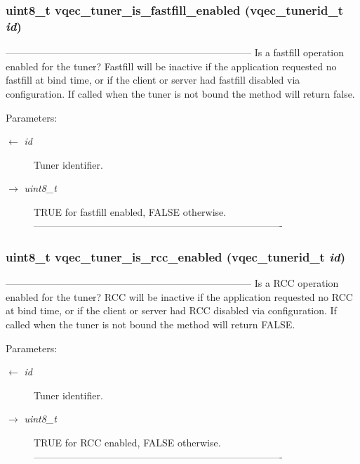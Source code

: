 \subsubsection{\setlength{\rightskip}{0pt plus 5cm}uint8\_\-t vqec\_\-tuner\_\-is\_\-fastfill\_\-enabled (vqec\_\-tunerid\_\-t {\em id})}\label{vqec__tuner_8c_ea34bc8b1f251e13dd145336b94a5d28}


--------------------------------------------------------------------------- Is a fastfill operation enabled for the tuner? Fastfill will be inactive if the application requested no fastfill at bind time, or if the client or server had fastfill disabled via configuration. If called when the tuner is not bound the method will return false.

\begin{Desc}
\item[Parameters:]
\begin{description}
\item[\mbox{$\leftarrow$} {\em id}]Tuner identifier. \item[\mbox{$\rightarrow$} {\em uint8\_\-t}]TRUE for fastfill enabled, FALSE otherwise. ---------------------------------------------------------------------------- \end{description}
\end{Desc}
\subsubsection{\setlength{\rightskip}{0pt plus 5cm}uint8\_\-t vqec\_\-tuner\_\-is\_\-rcc\_\-enabled (vqec\_\-tunerid\_\-t {\em id})}\label{vqec__tuner_8c_5fb2cc65331f006b110100d86b278821}


--------------------------------------------------------------------------- Is a RCC operation enabled for the tuner? RCC will be inactive if the application requested no RCC at bind time, or if the client or server had RCC disabled via configuration. If called when the tuner is not bound the method will return FALSE.

\begin{Desc}
\item[Parameters:]
\begin{description}
\item[\mbox{$\leftarrow$} {\em id}]Tuner identifier. \item[\mbox{$\rightarrow$} {\em uint8\_\-t}]TRUE for RCC enabled, FALSE otherwise. ---------------------------------------------------------------------------- \end{description}
\end{Desc}
